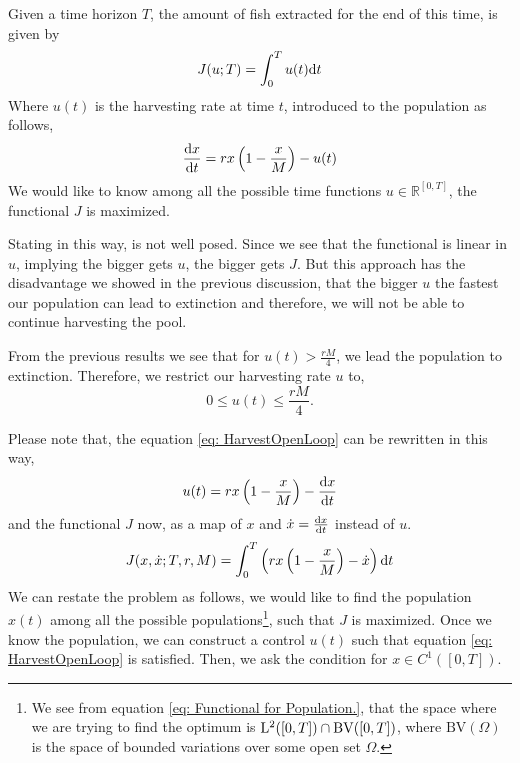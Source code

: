 Given a time horizon $T$, the amount of fish extracted for the end of this time, is given by
\begin{equation}
	J(u;T)=\int_{0}^{T} u(t)\mathrm{d} t
\end{equation}
Where $u(t)$ is the harvesting rate at time $t$, introduced to the population as follows,
\begin{equation}
	\frac{\mathrm{d} x}{{\mathrm{d} t}}=rx\left(1-\frac{x}{M}\right)-u(t) \label{eq: HarvestOpenLoop}
\end{equation}
We would like to know among all the possible time functions $u\in \mathbb{R}^{[0,T]}$, the functional $J$ is maximized. 

Stating in this way, is not well posed. Since we see that the functional is linear in $u$, implying the bigger gets $u$, the bigger gets $J$. But this approach has the disadvantage we showed in the previous discussion, that the bigger $u$ the fastest our population can lead to extinction and therefore, we will not be able to continue harvesting the pool. 

From the previous results we see that for $u(t)>\frac{rM}{4}$, we lead the population to extinction. Therefore, we restrict our harvesting rate $u$ to,
\begin{equation}
0\leq u(t)\leq\frac{rM}{4}. \label{eq: OpenLoopConstrain}
\end{equation}

Please note that, the equation \ref{eq: HarvestOpenLoop} can be rewritten in this way,
\begin{equation}
	u(t)=rx\left(1-\frac{x}{M}\right)-\frac{\mathrm{d} x}{{\mathrm{d} t}} \label{eq: OpenLoopControl}
\end{equation}
and the functional $J$ now, as a map of $x$ and $\dot{x}=\frac{\mathrm{d} x}{{\mathrm{d} t}}$ instead of $u$.
\begin{equation}
	J(x,\dot{x};T,r,M)=\int_{0}^{T} \left(rx\left(1-\frac{x}{M}\right)-\dot{x}\right) \mathrm{d} t \label{eq: Functional for Population.}
\end{equation}
We can restate the problem as follows, we would like to find the population $x(t)$ among all the possible populations\footnote{We see from equation \ref{eq: Functional for Population.}, that the space where we are trying to find the optimum is $\mathrm{L}^2([0,T])\cap \mathrm{BV}([0,T])$, where $\mathrm{BV}(\Omega)$ is the space of bounded variations over some open set $\Omega$. }, such that $J$ is maximized. Once we know the population, we can construct a control $u(t)$ such that equation \ref{eq: HarvestOpenLoop} is satisfied. Then, we ask the condition for $x \in C^1([0,T])$.

